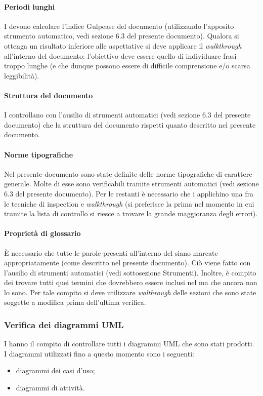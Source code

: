 			\paragraph{Periodi lunghi}
				I  devono calcolare l'indice Gulpease del documento (utilizzando l'apposito strumento automatico, vedi sezione 6.3 del presente documento). Qualora si ottenga un risultato inferiore alle aspettative si deve applicare il \textit{walkthrough} all'interno del documento: l'obiettivo deve essere quello di individuare frasi troppo lunghe (e che dunque possono essere di difficile comprensione e/o scarsa leggibilità).
			\paragraph{Struttura del documento}
				I  controllano con l'ausilio di strumenti automatici (vedi sezione 6.3 del presente documento) che la struttura del documento rispetti quanto descritto nel presente documento.
			\paragraph{Norme tipografiche}
				Nel presente documento sono state definite delle norme tipografiche di carattere generale. Molte di esse sono verificabili tramite strumenti automatici (vedi sezione 6.3 del presente documento). Per le restanti è necessario che i  applichino una fra le tecniche di inspection e \textit{walkthrough}	(si preferisce la prima nel momento in cui tramite la lista di controllo si riesce a trovare la grande maggioranza degli errori).
			\paragraph{Proprietà di glossario}
				È necessario che tutte le parole presenti all'interno del  siano marcate appropriatamente (come descritto nel presente documento). Ciò viene fatto con l'ausilio di strumenti automatici (vedi sottosezione Strumenti). Inoltre, è compito dei  trovare tutti quei termini che dovrebbero essere inclusi nel  ma che ancora non lo sono. Per tale compito si deve utilizzare \textit{walthrough} delle sezioni che sono state soggette a modifica prima dell'ultima verifica.
		\subsubsection{Verifica dei diagrammi UML}
			I  hanno il compito di controllare tutti i diagrammi UML che sono stati prodotti. I diagrammi utilizzati fino a questo momento 
			sono i seguenti:
			\begin{itemize}
				\item diagrammi dei casi d'uso;
				\item diagrammi di attività.
			\end{itemize}
